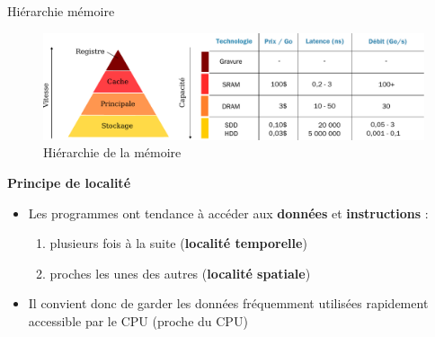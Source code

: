 \documentclass[8pt]{beamer}
\begin{document}
\begin{frame}{Hiérarchie mémoire}

    \begin{figure}
        \centering
        \includegraphics[width=\linewidth]{figures/hierarchy_memory.pdf}
        \caption{Hiérarchie de la mémoire \cite{harris2021digital}}
    \end{figure}

    \textbf{Principe de localité}
    \begin{itemize}
        \item Les programmes ont tendance à accéder aux \textbf{données} et
              \textbf{instructions} :
              \begin{enumerate}
                  \item plusieurs fois \`a la suite (\textbf{localité
                            temporelle})
                  \item proches les unes des autres (\textbf{localité
                            spatiale})
              \end{enumerate}
        \item Il convient donc de garder les données fréquemment utilisées
              rapidement
              accessible par le CPU (proche du CPU)
    \end{itemize}
\end{frame}
\end{document}
